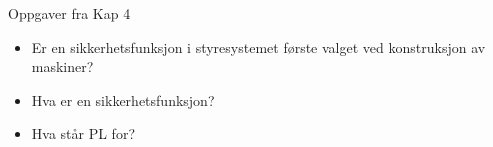 Oppgaver fra Kap 4
\begin{itemize}[noitemsep]


\item Er en sikkerhetsfunksjon i styresystemet første valget ved konstruksjon av maskiner?

\item Hva er en sikkerhetsfunksjon?

\item Hva står PL for?


\end{itemize}
	
	

